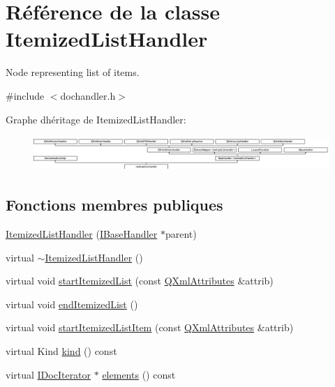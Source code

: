 \hypertarget{class_itemized_list_handler}{}\section{Référence de la classe Itemized\+List\+Handler}
\label{class_itemized_list_handler}


Node representing list of items.  




{\ttfamily \#include $<$dochandler.\+h$>$}

Graphe d\textquotesingle{}héritage de Itemized\+List\+Handler\+:\begin{figure}[H]
\begin{center}
\leavevmode
\includegraphics[height=1.327801cm]{class_itemized_list_handler}
\end{center}
\end{figure}
\subsection*{Fonctions membres publiques}
\begin{DoxyCompactItemize}
\item 
\hyperlink{class_itemized_list_handler_a1064ca6abf6830a8be4020e725b0f7aa}{Itemized\+List\+Handler} (\hyperlink{class_i_base_handler}{I\+Base\+Handler} $\ast$parent)
\item 
virtual \hyperlink{class_itemized_list_handler_a85edbd1d170977480baa2a20eab0df10}{$\sim$\+Itemized\+List\+Handler} ()
\item 
virtual void \hyperlink{class_itemized_list_handler_a8f429f17b500def4158786c09911cff6}{start\+Itemized\+List} (const \hyperlink{class_q_xml_attributes}{Q\+Xml\+Attributes} \&attrib)
\item 
virtual void \hyperlink{class_itemized_list_handler_a5a8688eeeba8c6eff5be740755065e20}{end\+Itemized\+List} ()
\item 
virtual void \hyperlink{class_itemized_list_handler_abc8eecc760fc90748d2c5e4a9c9964fc}{start\+Itemized\+List\+Item} (const \hyperlink{class_q_xml_attributes}{Q\+Xml\+Attributes} \&attrib)
\item 
virtual Kind \hyperlink{class_itemized_list_handler_a8d7d7a0325a2dbe6f0377034f616d721}{kind} () const 
\item 
virtual \hyperlink{class_i_doc_iterator}{I\+Doc\+Iterator} $\ast$ \hyperlink{class_itemized_list_handler_a4bb713c37baeca1d85e8d3ad059997e2}{elements} () const 
\end{DoxyCompactItemize}
